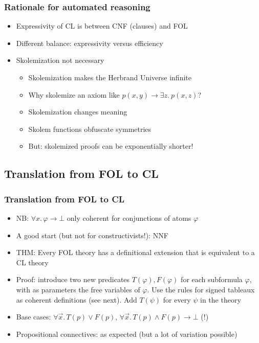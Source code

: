 \documentclass[handout,11pt]{beamer}
\newcommand{\imp}{\rightarrow}
\begin{document}
\begin{frame}
\frametitle{Rationale for automated reasoning}
 \begin{itemize}[<+->] %
    \item Expressivity of CL is between CNF (clauses) and FOL
    \item Different balance: expressivity versus efficiency
    \item Skolemization not necessary
    \begin{itemize}
       \item Skolemization makes the Herbrand Universe infinite
       \item Why skolemize an axiom like $p(x,y)\to\exists z.~p(x,z)$?
       \item Skolemization changes meaning
       \item Skolem functions obfuscate symmetries
       \item \alert{But: skolemized proofs can be exponentially shorter!}
    \end{itemize}
 \end{itemize}
\end{frame}

\subsection{Translation from FOL to CL}

\begin{frame}
\frametitle{Translation from FOL to CL}
 \begin{itemize}[<+->]
   \item NB: $\forall x.\,\varphi \to\bot$ only coherent for \alert{conjunctions of atoms} $\varphi$
   \item A good start (but not for constructivists!): NNF
   \item THM: Every FOL theory has a definitional extension that is equivalent to a CL theory
   \item Proof: introduce two new predicates $T(\varphi),F(\varphi)$ for each subformula $\varphi$, with as parameters the free variables of $\varphi$.
 Use the rules for signed tableaux as coherent definitions (see next).
Add $T(\psi)$ for every $\psi$ in the theory
 \item Base cases: $\forall\vec x.\,T(p) \lor F(p)$, $\forall\vec x.\,T(p) \land F(p) \imp \bot$
(\alert{!})
\item Propositional connectives: as expected (but a lot of variation possible)
 \end{itemize}
\end{frame}
 
\end{document}
